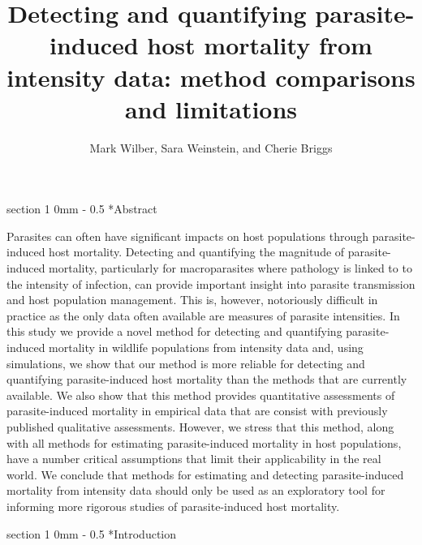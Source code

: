 \documentclass[12pt, a4paper]{article}
\title{Detecting and quantifying parasite-induced host mortality from intensity data: method comparisons and limitations}
\author{Mark Wilber, Sara Weinstein, and Cherie Briggs}
\makeatletter
\renewcommand{\section}{\@startsection
{section}%
{1}%
{0mm}%
{-\baselineskip}%
{0.5\baselineskip}%
{\normalfont\bf\large}} %
\makeatother
\begin{document}
\maketitle

\section*{Abstract}

Parasites can often have significant impacts on host populations through parasite-induced host mortality.  Detecting and quantifying the magnitude of parasite-
induced mortality, particularly for macroparasites where pathology is
linked to to the intensity of infection, can provide important insight into
parasite transmission and host population management. This is, however,
notoriously difficult in practice as the only data often available are measures of parasite intensities. In this study we provide a novel method for detecting and
quantifying parasite-induced mortality in wildlife populations from intensity
data and, using simulations, we show that our method is more reliable for
detecting and quantifying parasite-induced host mortality than the methods that are
currently available.  We also show that this method provides quantitative
assessments of parasite-induced mortality in empirical data that are consist
with previously published qualitative assessments. However, we stress that this
method, along with all methods for estimating parasite-induced mortality in
host populations, have a number critical assumptions that limit their
applicability in the real world.  We conclude that methods for estimating and
detecting parasite-induced mortality from intensity data should only be used as an
exploratory tool for informing more rigorous studies of parasite-induced host
mortality.

\doublespacing

\linenumbers
\section*{Introduction}
\end{document}
